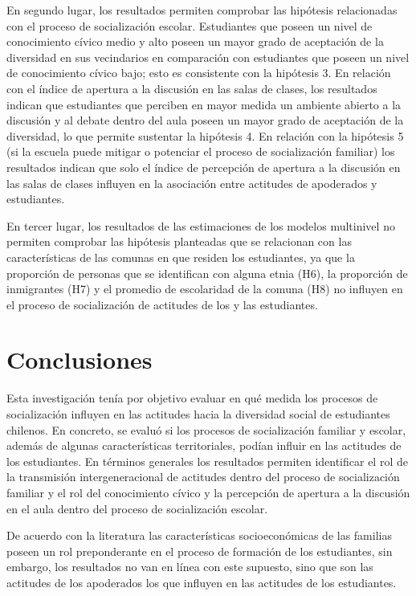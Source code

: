 \documentclass[12pt,twoside]{templates/facsothesis}
\begin{document}
En segundo lugar, los resultados permiten comprobar las hipótesis relacionadas con el proceso de socialización escolar. Estudiantes que poseen un nivel de conocimiento cívico medio y alto poseen un mayor grado de aceptación de la diversidad en sus vecindarios en comparación con estudiantes que poseen un nivel de conocimiento cívico bajo; esto es consistente con la hipótesis 3. En relación con el índice de apertura a la discusión en las salas de clases, los resultados indican que estudiantes que perciben en mayor medida un ambiente abierto a la discusión y al debate dentro del aula poseen un mayor grado de aceptación de la diversidad, lo que permite sustentar la hipótesis 4. En relación con la hipótesis 5 (si la escuela puede mitigar o potenciar el proceso de socialización familiar) los resultados indican que solo el índice de percepción de apertura a la discusión en las salas de clases influyen en la asociación entre actitudes de apoderados y estudiantes.

En tercer lugar, los resultados de las estimaciones de los modelos multinivel no permiten comprobar las hipótesis planteadas que se relacionan con las características de las comunas en que residen los estudiantes, ya que la proporción de personas que se identifican con alguna etnia (H6), la proporción de inmigrantes (H7) y el promedio de escolaridad de la comuna (H8) no influyen en el proceso de socialización de actitudes de los y las estudiantes.

\hypertarget{conclusiones}{%
\chapter{Conclusiones}\label{conclusiones}}

Esta investigación tenía por objetivo evaluar en qué medida los procesos de socialización influyen en las actitudes hacia la diversidad social de estudiantes chilenos. En concreto, se evaluó si los procesos de socialización familiar y escolar, además de algunas características territoriales, podían influir en las actitudes de los estudiantes. En términos generales los resultados permiten identificar el rol de la transmisión intergeneracional de actitudes dentro del proceso de socialización familiar y el rol del conocimiento cívico y la percepción de apertura a la discusión en el aula dentro del proceso de socialización escolar.

De acuerdo con la literatura las características socioeconómicas de las familias poseen un rol preponderante en el proceso de formación de los estudiantes, sin embargo, los resultados no van en línea con este supuesto, sino que son las actitudes de los apoderados los que influyen en las actitudes de los estudiantes.
\end{document}

